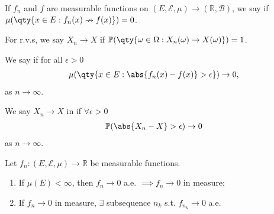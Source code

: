 \begin{definition}
	If $f_n$ and $f$ are measurable functions on $(E,\mathcal E,\mu) \to (\mathbb{R}, \mathcal{B})$, we say  if $\mu(\qty{x \in E : f_n(x) \nrightarrow f(x)}) = 0$.

	For r.v.s, we say $X_n \to X$  if $\mathbb{P}(\qty{\omega \in \Omega : X_n(\omega) \to X(\omega)}) = 1$.
\end{definition}

\begin{definition}
	We say  if for all $\epsilon > 0$
	\begin{align*}
		\mu(\qty{x\in E : \abs{f_n(x) - f(x)} > \epsilon}) \to 0,
	\end{align*} as $n \to \infty$.

	We say $X_n \to X$ in  if $\forall \epsilon > 0$
	\begin{align*}
		\mathbb{P}(\abs{X_n - X} > \epsilon) \to 0
	\end{align*} as $n \to \infty$.
\end{definition}

\begin{theorem} \label{thm:inprobinmeasure}
	Let $f_n \colon (E,\mathcal E,\mu) \to \mathbb R$ be measurable functions.
	\begin{enumerate}
		\item If $\mu(E) < \infty$, then $f_n \to 0$ a.e. $\implies f_n \to 0$ in measure;
		\item If $f_n \to 0$ in measure, $\exists$ subsequence $n_k$ s.t. $f_{n_k} \to 0$ a.e.
	\end{enumerate}
\end{theorem}


